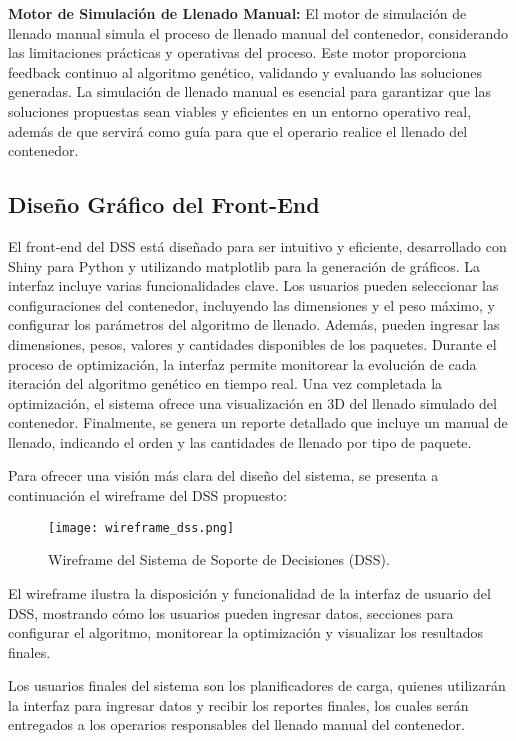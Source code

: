 \documentclass[9pt,a4paper]{rho}
\begin{document}
\textbf{Motor de Simulación de Llenado Manual:} El motor de simulación de llenado manual simula el proceso de llenado manual del contenedor, considerando las limitaciones prácticas y operativas del proceso. Este motor proporciona feedback continuo al algoritmo genético, validando y evaluando las soluciones generadas. La simulación de llenado manual es esencial para garantizar que las soluciones propuestas sean viables y eficientes en un entorno operativo real, además de que servirá como guía para que el operario realice el llenado del contenedor.

\subsection{Diseño Gráfico del Front-End}

El front-end del DSS está diseñado para ser intuitivo y eficiente, desarrollado con Shiny para Python y utilizando matplotlib para la generación de gráficos. La interfaz incluye varias funcionalidades clave. Los usuarios pueden seleccionar las configuraciones del contenedor, incluyendo las dimensiones y el peso máximo, y configurar los parámetros del algoritmo de llenado. Además, pueden ingresar las dimensiones, pesos, valores y cantidades disponibles de los paquetes. Durante el proceso de optimización, la interfaz permite monitorear la evolución de cada iteración del algoritmo genético en tiempo real. Una vez completada la optimización, el sistema ofrece una visualización en 3D del llenado simulado del contenedor. Finalmente, se genera un reporte detallado que incluye un manual de llenado, indicando el orden y las cantidades de llenado por tipo de paquete.

Para ofrecer una visión más clara del diseño del sistema, se presenta a continuación el wireframe del DSS propuesto:

\begin{figure}[h!]
    \centering
    \texttt{[image: wireframe\_dss.png]}
    \caption{Wireframe del Sistema de Soporte de Decisiones (DSS).}
    \label{fig:wireframe_dss}
\end{figure}

El wireframe ilustra la disposición y funcionalidad de la interfaz de usuario del DSS, mostrando cómo los usuarios pueden ingresar datos, secciones para configurar el algoritmo, monitorear la optimización y visualizar los resultados finales.

Los usuarios finales del sistema son los planificadores de carga, quienes utilizarán la interfaz para ingresar datos y recibir los reportes finales, los cuales serán entregados a los operarios responsables del llenado manual del contenedor.
\end{document}
